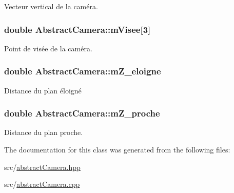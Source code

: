 Vecteur vertical de la caméra. 

\hypertarget{class_abstract_camera_a5c7db642de2add50fad69539a8b220d8}{
\subsubsection[{m\+Visee}]{\setlength{\rightskip}{0pt plus 5cm}double Abstract\+Camera\+::m\+Visee\mbox{[}3\mbox{]}\hspace{0.3cm}{\ttfamily [protected]}}}\label{class_abstract_camera_a5c7db642de2add50fad69539a8b220d8}


Point de visée de la caméra. 

\hypertarget{class_abstract_camera_a8e076553a55c8e2f19948bdf4ea01be1}{
\subsubsection[{m\+Z\+\_\+eloigne}]{\setlength{\rightskip}{0pt plus 5cm}double Abstract\+Camera\+::m\+Z\+\_\+eloigne\hspace{0.3cm}{\ttfamily [protected]}}}\label{class_abstract_camera_a8e076553a55c8e2f19948bdf4ea01be1}


Distance du plan éloigné 

\hypertarget{class_abstract_camera_a408e219c2aed42b6aa4f9198c252d10a}{
\subsubsection[{m\+Z\+\_\+proche}]{\setlength{\rightskip}{0pt plus 5cm}double Abstract\+Camera\+::m\+Z\+\_\+proche\hspace{0.3cm}{\ttfamily [protected]}}}\label{class_abstract_camera_a408e219c2aed42b6aa4f9198c252d10a}


Distance du plan proche. 



The documentation for this class was generated from the following files\+:\begin{DoxyCompactItemize}
\item 
src/\hyperlink{abstract_camera_8hpp}{abstract\+Camera.\+hpp}\item 
src/\hyperlink{abstract_camera_8cpp}{abstract\+Camera.\+cpp}\end{DoxyCompactItemize}
